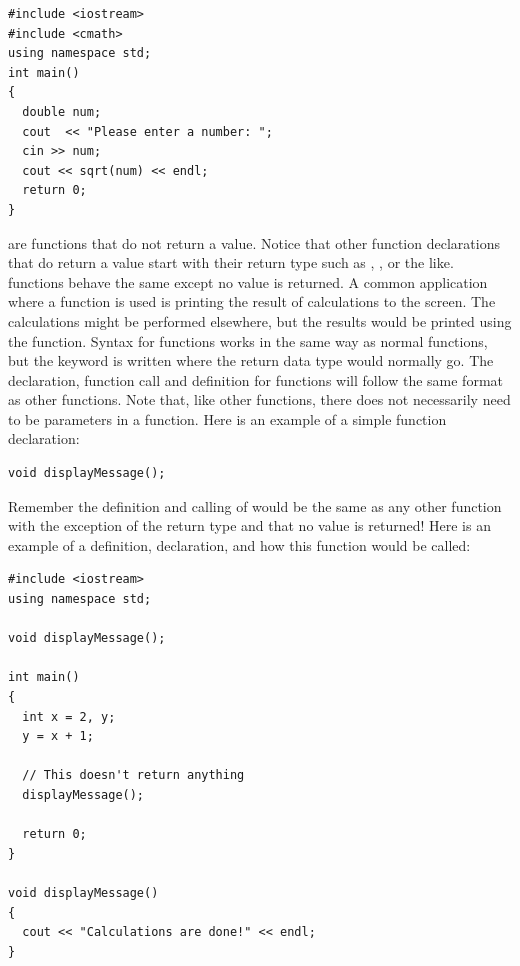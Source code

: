 \noindent\begin{minipage}{\linewidth}\begin{lstlisting}
#include <iostream>
#include <cmath>
using namespace std;
int main()
{
  double num;
  cout  << "Please enter a number: ";
  cin >> num;
  cout << sqrt(num) << endl;
  return 0;
}
\end{lstlisting}\end{minipage}
 
 
 are functions that do not return a value. 
Notice that other function declarations that do return a value start with their return type such as , , or the like. 
 functions behave the same except no value is returned. 
A common application where a  function is used is printing the result of calculations to the screen.
The calculations might be performed elsewhere, but the results would be printed using the  function.
Syntax for  functions works in the same way as normal functions, but the keyword  is written where the return data type would normally go. 
The declaration, function call and definition for  functions will follow the same format as other functions. 
Note that, like other functions, there does not necessarily need to be parameters in a  function.
Here is an example of a simple  function declaration:

\noindent\begin{minipage}{\linewidth}\begin{lstlisting}
void displayMessage();
\end{lstlisting}\end{minipage}

Remember the definition and calling of  would be the same as any other function with the exception of the  return type and that no value is returned! 
Here is an example of a definition, declaration, and how this function would be called:

\noindent\begin{minipage}{\linewidth}\begin{lstlisting}
#include <iostream>
using namespace std;

void displayMessage();

int main()
{
  int x = 2, y;
  y = x + 1;
  
  // This doesn't return anything
  displayMessage(); 
  
  return 0;
}

void displayMessage()
{
  cout << "Calculations are done!" << endl;
}
\end{lstlisting}\end{minipage}

